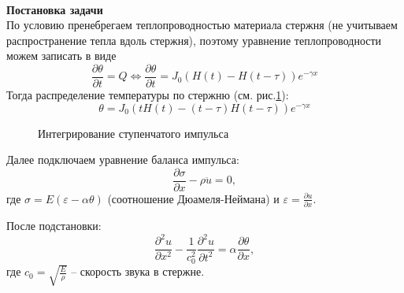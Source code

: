 \documentclass[a4paper, 11pt]{article}
\newcommand{\beq}{\begin{equation}}
\newcommand{\eeq}{\end{equation}}
\newenvironment{solution}
    {\textit{}}
    {}
\begin{document}
\begin{solution}\\
\textbf{Постановка задачи}\\

По условию пренебрегаем теплопроводностью материала стержня (не учитываем распространение тепла вдоль стержня), поэтому уравнение теплопроводности можем записать в виде
\beq
\frac{\partial\theta}{\partial t}=Q\Leftrightarrow\frac{\partial\theta}{\partial t}=J_0(H(t)-H(t-\tau))e^{-\gamma x}
\eeq
Тогда распределение температуры по стержню (см. рис.\ref{fig:integrate}):
\beq\label{Temperature}
\theta=J_0\left(tH(t)-(t-\tau)H(t-\tau)\right)e^{-\gamma x}
\eeq
\begin{figure}[h]
\centering
{}
\caption{Интегрирование ступенчатого импульса}
\label{fig:integrate}
\end{figure}


Далее подключаем уравнение баланса импульса:
\beq
\frac{\partial\sigma}{\partial x}-\rho\ddot{u}=0,
\eeq
где $\sigma=E\left(\varepsilon-\alpha\theta\right)$ (соотношение Дюамеля-Неймана) и $\displaystyle{}\varepsilon=\frac{\partial u}{\partial x}$.

После подстановки:
\beq
\frac{\partial^2u}{\partial x^2}-\frac{1}{c_0^2}\frac{\partial^2u}{\partial t^2}=\alpha\frac{\partial\theta}{\partial x},
\eeq
где $\displaystyle{}c_0=\sqrt{\frac{E}{\rho}}$ -- скорость звука в стержне.\\\\


\end{solution}
\end{document}
